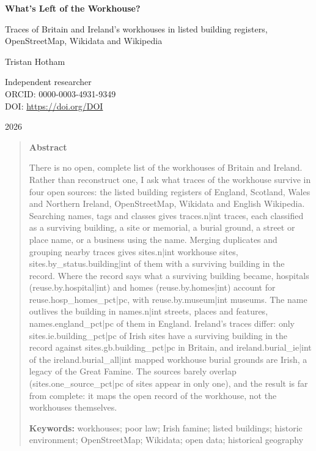 \documentclass[11pt,a4paper]{article}
\begin{document}
\begin{center}
{\Large\bfseries What's Left of the Workhouse?\par}
\vspace{0.4em}
{\large Traces of Britain and Ireland's workhouses in listed building registers,\\OpenStreetMap, Wikidata and Wikipedia\par}
\vspace{1.2em}
{\large Tristan Hotham\par}
\vspace{0.3em}
{\small Independent researcher\\
ORCID: 0000-0003-4931-9349\\
DOI: \href{https://doi.org/{{DOI}}}{https://doi.org/{{DOI}}}\par}
\vspace{0.8em}
2026
\end{center}

\begin{quote}
\small
\begin{center}\textbf{Abstract}\end{center}
There is no open, complete list of the workhouses of Britain and Ireland. Rather than reconstruct one, I ask what traces of the workhouse survive in four open sources: the listed building registers of England, Scotland, Wales and Northern Ireland, OpenStreetMap, Wikidata and English Wikipedia. Searching names, tags and classes gives {{traces.n|int}} traces, each classified as a surviving building, a site or memorial, a burial ground, a street or place name, or a business using the name. Merging duplicates and grouping nearby traces gives {{sites.n|int}} workhouse sites, {{sites.by_status.building|int}} of them with a surviving building in the record. Where the record says what a surviving building became, hospitals ({{reuse.by.hospital|int}}) and homes ({{reuse.by.homes|int}}) account for {{reuse.hosp_homes_pct|pc}}, with {{reuse.by.museum|int}} museums. The name outlives the building in {{names.n|int}} streets, places and features, {{names.england_pct|pc}} of them in England. Ireland's traces differ: only {{sites.ie.building_pct|pc}} of Irish sites have a surviving building in the record against {{sites.gb.building_pct|pc}} in Britain, and {{ireland.burial_ie|int}} of the {{ireland.burial_all|int}} mapped workhouse burial grounds are Irish, a legacy of the Great Famine. The sources barely overlap ({{sites.one_source_pct|pc}} of sites appear in only one), and the result is far from complete: it maps the open record of the workhouse, not the workhouses themselves.

\textbf{Keywords:} workhouses; poor law; Irish famine; listed buildings; historic environment; OpenStreetMap; Wikidata; open data; historical geography
\end{quote}
\end{document}
